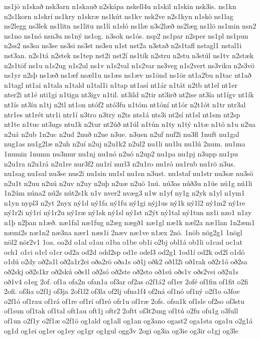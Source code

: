 {ns1jö
n1skað
nsk3arn
n1skauð
n2skápa
nskell4u
n1skil
n1skin
nsk3is.
ns1kn
n2s1korn
n1skrí
ns1kry
n1skræ
ns1kút
ns1kv
nsk2ve
n2s1kyn
n1skö
ns1lag
ns2legg
ns3lek
ns1litn
ns1litu
ns1lí
n1sló
ns1læ
n3s2læð
ns2læg
ns1lö
ns1min
nsn2
ns1no
ns1nó
nsn3u
ns1ný
ns1og.
n3sok
ns1ós.
nsp2
ns1par
n2sper
ns1pl
ns1pun
n2ss2
ns3sa
ns3se
ns3si
ns3st
ns3su
n1st
nst2a
n3stað
n2s1tafl
nstagl1
nstal1i
nst3an.
n2s1tá
n2stek
ns1tep
nst2i
nst2í
ns1tík
n2stru
n2stu
n3stúl
ns1tv
n2stæk
n2s1töf
ns1u
n1s2ug
n1s2ul
ns1v
n1s2val
n1s2var
ns3veg
n1s2vert
ns3viku
n2s3vö
ns1yr
n2sþ
ns1æð
ns1æf
nsæl1u
ns1æs
ns1æv
ns1önd
ns1ör
nt1a2bu
n1tac
nt1að
n1tagl
nt1ai
n1tala
n1tald
n1tal1i
n1tap
nt1así
nt1ár
n1tát
n2tb
nt1el
nt1er
nter2i
nt1é
nti1gi
n1tign
nt3igv
n1til.
nt3ild
n2tir
nt3irð
nt2ise
nt3ía
nt1ígv
nt1ík
nt1ís
nt3íu
n1tj
n2tl
nt1on
ntóf2
ntó3fu
n1tóm
nt1óní
nt1ór
n2t1ót
n1tr
ntr3al
ntr1es
nt1rét
ntr1i
ntr1í
n3tro
n3try
n2ts
nts1á
nts3i
nt2sí
nt1sl
nt1sm
nt2sp
nt1te
n1tuc
nt3ugs
ntu1k
n2tur
nt2úð
nt1úl
n1tún
n1ty
n1tý
n1tæ
n1tö
n1u
n2ua
n2uá
n2ub
1n2uc
n2ud
2nuð
n2ue
n3ue.
n3uen
n2uf
nuf2i
nu3fl
1nuft
nu1gal
nug1as
nu1g2læ
n2uh
n2uí
n2uj
n2u1k2
n2ul2
nu1li
nu1lu
nu1lú
2num.
nu1ma
1numin
1numn
nu3mur
nu1nj
nu1nó
n2uó
n2up2
nu1pa
nu1pj
n3upp
nu1pu
n2u1ra
n2u1rá
n2u1re
nur3f2
nu1rí
nurl3
n2u1ro
nu1ró
nu1rub
nu1rö
n3us.
nu1sag
nu1sal
nu3se
nus2i
nu1sin
nu1sl
nu1sn
n3ust.
nu1staf
nu1str
nu3sæ
nu3sö
n2u1t
n2uu
n2uú
n2uv
n2uy
n2uþ
n2uæ
n2uö
1nú.
nú3as
núð3u
n1úe
nú1g
nú1li
1n2úm
núna2
nú2s
nút2s1k
n1v
nver2
nvæg3
n1w
n1yf
ny1g
n2yk
n1yl
n1ym1
n1yn
nypl3
n2yt
2nyx
ný1d
ný1fa
ný1fu
ný1gi
nýj1us
ný1k
ný1l2
ný1m2
ný1re
ný1r2i
ný1rí
ný1r2u
ný1ræ
ný1sk
ný1sl
ný1st
n2ýt
ný1tal
ný1tun
nz1i
nzo1
n1zy
n1þ
n2þan
n1æð.
næ1fal
næ1fug
n2æg
nægð1
næ1gl
næ1k
næl2a
næ1lan
1n2æm1
næmi2s
næ1n2
næ3na
nær1
næs1i
2næv
næ1ve
n1æx
2nö.
1nöb
nög2g1
1nögl
nöl2
nör2v1
1oa.
oa2d
o1al
o1au
o1ba
o1be
ob1i
o2bj
obl1á
ob1li
o1cad
oc1at
och1
o1ci
o1cl
o1cr
od2a
od2d
odd2sp
od1e
odel3
od2g1
1od1í
od2k
od2l
o1dó
o1dú
o2dy
oð2a1l
oð2a1r2ei
oða2rö
oða1s
oð1j
oðk2
oð1l2i
oð1rak
oð2r1ó
oð2sa
oð2skj
oð2s1kr
oð2skú
oðs1l
oð2só
oð2ste
oð2sto
oð1sú
oðs1v
oðs2vei
oð2u1s
oð1v4
o1eg
2of.
of1a
ofa2n
ofan1a
of3ar
of2as
o2f1á2
of1er
2ofé
of1fin
of1fit
o2fi
2ofi.
of3ia
o2f1j
of3ja
2of1l2
of3la
of2lj
ofna1f4
of2ná
of1nó
of1ný
o2f1o
o3foe
o2f1ó
of1rau
of1rá
of1re
of1rí
of1ró
ofr1u
of1ræ
2ofs.
ofsa1k
of1sle
of2so
of3stu
of1sun
of1tak
of1tal
oft1au
oft1j
oftr2
2oftt
of3t2ung
of1tú
o2fu
ofu1g
o3full
of1un
o2f1y
o2f1æ
o2f1ö
og1ald
og1all
og1an
og3ano
ogast2
oga1sta
oga1u
o2g1á
og1d
og1ei
og1er
og1ey
og1gr
og1gul
ogg3v
2ogi
og3ia
og3ie
og3ir
o1gj
og3le
}
